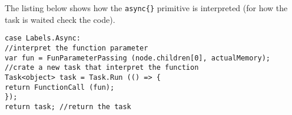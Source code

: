 The listing below shows how the \texttt{async\{\}} primitive is interpreted (for how the task is waited check the code).

\begin{lstlisting}[caption=Interpreting the \texttt{async\{\}}: how to create a task.]
case Labels.Async:
//interpret the function parameter
var fun = FunParameterPassing (node.children[0], actualMemory);
//crate a new task that interpret the function
Task<object> task = Task.Run (() => {
return FunctionCall (fun);
});
return task; //return the task
\end{lstlisting}

